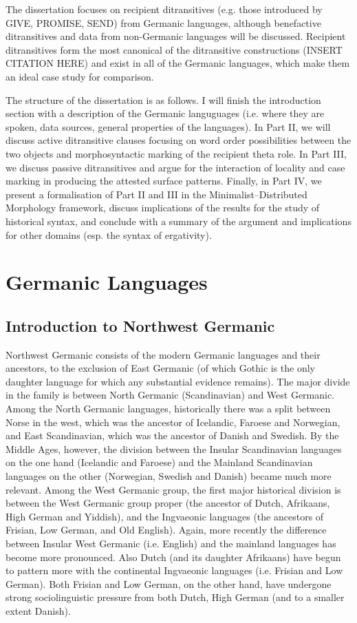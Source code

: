 The dissertation focuses on recipient ditransitives (e.g. those introduced by GIVE, PROMISE, SEND) from Germanic languages, although benefactive ditransitives and data from non-Germanic languages will be discussed. Recipient ditransitives form the most canonical of the ditransitive constructions (INSERT CITATION HERE) and exist in all of the Germanic languages, which make them an ideal case study for comparison.

The structure of the dissertation is as follows. I will finish the introduction section with a description of the Germanic languguages (i.e. where they are spoken, data sources, general properties of the languages). In Part II, we will discuss active ditransitive clauses focusing on word order possibilities between the two objects and morphosyntactic marking of the recipient theta role. In Part III, we discuss passive ditransitives and argue for the interaction of locality and case marking in producing the attested surface patterns. Finally, in Part IV, we present a formalisation of Part II and III in the Minimalist--Distributed Morphology framework, discuss implications of the results for the study of historical syntax, and conclude with a summary of the argument and implications for other domains (esp. the syntax of ergativity).

\chapter{Germanic Languages}

\label{ch:germanic-languages}
\section{Introduction to Northwest Germanic}
Northwest Germanic consists of the modern Germanic languages and their ancestors, to the exclusion of East Germanic (of which Gothic is the only daughter language for which any substantial evidence remains). The major divide in the family is between North Germanic (Scandinavian) and West Germanic. Among the North Germanic languages, historically there was a split between Norse in the west, which was the ancestor of Icelandic, Faroese and Norwegian, and East Scandinavian, which was the ancestor of Danish and Swedish. By the Middle Ages, however, the division between the Insular Scandinavian languages on the one hand (Icelandic and Faroese) and the Mainland Scandinavian languages on the other (Norwegian, Swedish and Danish) became much more relevant. Among the West Germanic group, the first major historical division is between the West Germanic group proper (the ancestor of Dutch, Afrikaans, High German and Yiddish), and the Ingvaeonic languages (the ancestors of Frisian, Low German, and Old English). Again, more recently the difference between Insular West Germanic (i.e. English) and the mainland languages has become more pronounced. Also Dutch (and its daughter Afrikaans) have begun to pattern more with the continental Ingvaeonic languages (i.e. Frisian and Low German). Both Frisian and Low German, on the other hand, have undergone strong sociolinguistic pressure from both Dutch, High German (and to a smaller extent Danish).

